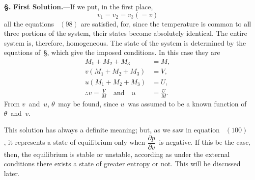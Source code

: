 \documentclass[12pt]{book}[2005/09/16]
\newcommand{\Chg}[2]{#2}
\newcommand{\Add}[1]{\Chg{}{#1}}
\newcommand{\Section}[1]{
  \medskip\par\textbf{§\;#1}
  \label{section:#1}
}
\newcommand{\SecRef}[2][§\;]{\hyperref[section:#2.]{{\upshape #1#2}}}
\newcommand{\Eq}[1]{%
  \hyperref[eqn:#1]{\ensuremath{#1}}%
}
\newcommand{\Topic}[1]{\textbf{#1}}
\newcommand{\dd}{\partial}
\begin{document}
\Section{170.} \Topic{First Solution.}---If we put, in the first place,
\[
v_{1} = v_{2} = v_{3} (= v)
\]
all the equations~\Eq{(98)} are satisfied, for, since the temperature
is common to all three portions of the system, their
states become absolutely identical. The entire system is,
therefore, homogeneous. The state of the system is determined
%
by the equations of~\SecRef{166}, which give the imposed
conditions. In this case they are
\begin{align*}
M_{1} + M_{2} + M_{3} &= M\Add{,} \\
v(M_{1} + M_{2} + M_{3}) &= V\Add{,} \\
u(M_{1} + M_{2} + M_{3}) &= U\Add{,} \\
\therefore
v = \frac{V}{M}\quad\text{and}\quad u &= \frac{U}{M}.
\end{align*}
From $v$~and~$u$, $\theta$~may be found, since $u$~was assumed to be
a known function of $\theta$~and~$v$.

This solution has always a definite meaning; but, as we
saw in equation~\Eq{(100)}, it represents a state of equilibrium
only when $\dfrac{\dd p}{\dd v}$~is negative. If this be the case, then, the
equilibrium is stable or unstable, according as under the
external conditions there exists a state of greater entropy
or not. This will be discussed later.
\end{document}
